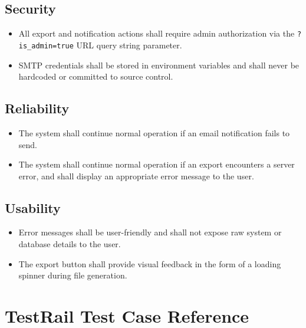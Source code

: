 \documentclass[12pt]{article}
\begin{document}
\subsection{Security}
\begin{itemize}
    \item All export and notification actions shall require admin authorization via the
    \texttt{?is\_admin=true} URL query string parameter.
    \item SMTP credentials shall be stored in environment variables and shall never be
    hardcoded or committed to source control.
\end{itemize}
 
\subsection{Reliability}
\begin{itemize}
    \item The system shall continue normal operation if an email notification fails to send.
    \item The system shall continue normal operation if an export encounters a server error,
    and shall display an appropriate error message to the user.
\end{itemize}
 
\subsection{Usability}
\begin{itemize}
    \item Error messages shall be user-friendly and shall not expose raw system or database
    details to the user.
    \item The export button shall provide visual feedback in the form of a loading spinner
    during file generation.
\end{itemize}
 
\appendix
\section{TestRail Test Case Reference}
 
\end{document}
